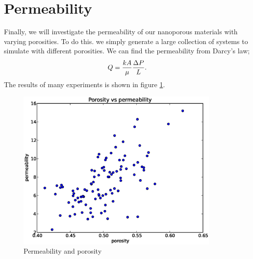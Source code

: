 \documentclass[12pt]{article}
\begin{document}
\section{Permeability}
Finally, we will investigate the permeability of our nanoporous materials with varying porosities. To do this. we simply generate a large collection of systems to simulate with different porosities. We can find the permeability from Darcy's law; 
\begin{equation}
 Q = {kA \over \mu}{\Delta P \over L}. 
\end{equation}
The results of many experiments is shown in figure \ref{fig:10}.
  \begin{figure}
  \centering
  \includegraphics[width=10cm]{perm.eps}
\caption{\label{fig:10} Permeability and porosity}
 \end{figure} 

 
\end{document}
